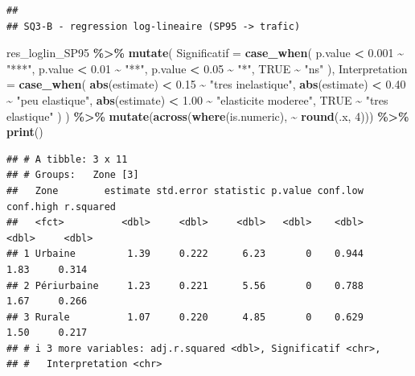 \documentclass[
]{article}
\newenvironment{Shaded}{\begin{snugshade}}{\end{snugshade}}
\newcommand{\AttributeTok}[1]{\textcolor[rgb]{0.13,0.29,0.53}{#1}}
\newcommand{\ConstantTok}[1]{\textcolor[rgb]{0.56,0.35,0.01}{#1}}
\newcommand{\DecValTok}[1]{\textcolor[rgb]{0.00,0.00,0.81}{#1}}
\newcommand{\FloatTok}[1]{\textcolor[rgb]{0.00,0.00,0.81}{#1}}
\newcommand{\FunctionTok}[1]{\textcolor[rgb]{0.13,0.29,0.53}{\textbf{#1}}}
\newcommand{\NormalTok}[1]{#1}
\newcommand{\SpecialCharTok}[1]{\textcolor[rgb]{0.81,0.36,0.00}{\textbf{#1}}}
\newcommand{\StringTok}[1]{\textcolor[rgb]{0.31,0.60,0.02}{#1}}
\begin{document}
\begin{verbatim}
## 
## SQ3-B - regression log-lineaire (SP95 -> trafic)
\end{verbatim}

\begin{Shaded}
\begin{Highlighting}[]
\NormalTok{res\_loglin\_SP95 }\SpecialCharTok{\%\textgreater{}\%}
  \FunctionTok{mutate}\NormalTok{(}
    \AttributeTok{Significatif =} \FunctionTok{case\_when}\NormalTok{(}
\NormalTok{      p.value }\SpecialCharTok{\textless{}} \FloatTok{0.001} \SpecialCharTok{\textasciitilde{}} \StringTok{"***"}\NormalTok{,}
\NormalTok{      p.value }\SpecialCharTok{\textless{}} \FloatTok{0.01}  \SpecialCharTok{\textasciitilde{}} \StringTok{"**"}\NormalTok{,}
\NormalTok{      p.value }\SpecialCharTok{\textless{}} \FloatTok{0.05}  \SpecialCharTok{\textasciitilde{}} \StringTok{"*"}\NormalTok{,}
      \ConstantTok{TRUE} \SpecialCharTok{\textasciitilde{}} \StringTok{"ns"}
\NormalTok{    ),}
    \AttributeTok{Interpretation =} \FunctionTok{case\_when}\NormalTok{(}
      \FunctionTok{abs}\NormalTok{(estimate) }\SpecialCharTok{\textless{}} \FloatTok{0.15} \SpecialCharTok{\textasciitilde{}} \StringTok{"tres inelastique"}\NormalTok{,}
      \FunctionTok{abs}\NormalTok{(estimate) }\SpecialCharTok{\textless{}} \FloatTok{0.40} \SpecialCharTok{\textasciitilde{}} \StringTok{"peu elastique"}\NormalTok{,}
      \FunctionTok{abs}\NormalTok{(estimate) }\SpecialCharTok{\textless{}} \FloatTok{1.00} \SpecialCharTok{\textasciitilde{}} \StringTok{"elasticite moderee"}\NormalTok{,}
      \ConstantTok{TRUE} \SpecialCharTok{\textasciitilde{}} \StringTok{"tres elastique"}
\NormalTok{    )}
\NormalTok{  ) }\SpecialCharTok{\%\textgreater{}\%}
  \FunctionTok{mutate}\NormalTok{(}\FunctionTok{across}\NormalTok{(}\FunctionTok{where}\NormalTok{(is.numeric), }\SpecialCharTok{\textasciitilde{}} \FunctionTok{round}\NormalTok{(.x, }\DecValTok{4}\NormalTok{))) }\SpecialCharTok{\%\textgreater{}\%}
  \FunctionTok{print}\NormalTok{()}
\end{Highlighting}
\end{Shaded}

\begin{verbatim}
## # A tibble: 3 x 11
## # Groups:   Zone [3]
##   Zone        estimate std.error statistic p.value conf.low conf.high r.squared
##   <fct>          <dbl>     <dbl>     <dbl>   <dbl>    <dbl>     <dbl>     <dbl>
## 1 Urbaine         1.39     0.222      6.23       0    0.944      1.83     0.314
## 2 Périurbaine     1.23     0.221      5.56       0    0.788      1.67     0.266
## 3 Rurale          1.07     0.220      4.85       0    0.629      1.50     0.217
## # i 3 more variables: adj.r.squared <dbl>, Significatif <chr>,
## #   Interpretation <chr>
\end{verbatim}
\end{document}
